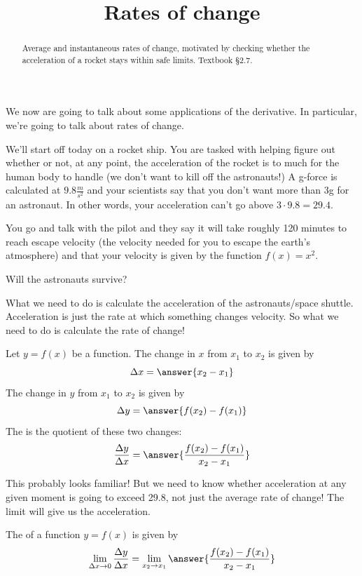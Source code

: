 \documentclass{ximera}
\title{Rates of change}
\begin{document}
\begin{abstract}
Average and instantaneous rates of change, motivated by checking whether the acceleration of a rocket stays within safe limits. Textbook §2.7.
\end{abstract}
\maketitle

We now are going to talk about some applications of the derivative. In particular, we're going to talk about rates of change.

We'll start off today on a rocket ship. You are tasked with helping figure out whether or not, at any point, the acceleration of the rocket is to much for the human body to handle (we don't want to kill off the astronauts!) A g-force is calculated at $9.8 \frac{m}{s^{2}}$ and your scientists say that you don't want more than 3g for an astronaut. In other words, your acceleration can't go above $3 \cdot 9.8=29.4$.

You go and talk with the pilot and they say it will take roughly 120 minutes to reach escape velocity (the velocity needed for you to escape the earth's atmosphere) and that your velocity is given by the function $f(x)=x^{2}$.

Will the astronauts survive?

What we need to do is calculate the acceleration of the astronauts/space shuttle. Acceleration is just the rate at which something changes velocity. So what we need to do is calculate the rate of change!

\begin{definition}\label{definition:4-12}
Let $y=f(x)$ be a function. The change in $x$ from $x_{1}$ to $x_{2}$ is given by
\[
\Delta x=\answer{x_{2}-x_{1}}
\]
The change in $y$ from $x_{1}$ to $x_{2}$ is given by
\[
\Delta y=\answer{f(x_{2})-f(x_{1})}
\]
The  is the quotient of these two changes:
\[
\frac{\Delta y}{\Delta x}=\answer{\frac{f(x_{2})-f(x_{1})}{x_{2}-x_{1}}}
\]
\end{definition}

This probably looks familiar! But we need to know whether acceleration at any given moment is going to exceed 29.8, not just the average rate of change! The limit will give us the acceleration.

\begin{definition}\label{definition:4-13}
The  of a function $y=f(x)$ is given by
\[
\lim_{\Delta x\rightarrow 0}\frac{\Delta y}{\Delta x}=\lim_{x_{2}\rightarrow x_{1}}\answer{\frac{f(x_{2})-f(x_{1})}{x_{2}-x_{1}}}
\]
\end{definition}
\end{document}
